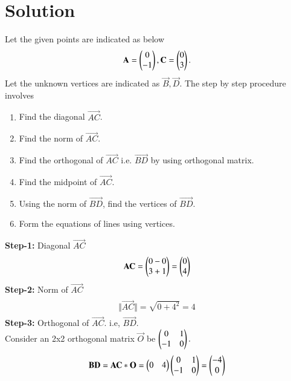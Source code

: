 \documentclass[journal,12pt,twocolumn]{IEEEtran}
\begin{document}
\section{Solution}
Let the given points are indicated as below\\
\begin{align}
\begin{split}
\mathbf{A} = \begin{pmatrix}0 \\ -1\end{pmatrix}, 
\mathbf{C} = \begin{pmatrix}0 \\ 3\end{pmatrix}.\\
\end{split}
\end{align}
Let the unknown vertices are indicated as $ \vec{B},\vec{D}$. The step by step procedure involves
\begin{enumerate}
    \item Find the diagonal $\vec{AC}$.
    \item Find the norm of $\vec{AC}$.
    \item Find the orthogonal of $\vec{AC}$ i.e. $\vec{BD}$ by using orthogonal matrix.
    \item Find the midpoint of $\vec{AC}$.
    \item Using the norm of $\vec{BD}$, find the vertices of $\vec{BD}$.
    \item Form the equations of lines using vertices.
\end{enumerate}
\textbf{Step-1:} Diagonal $\vec{AC}$
\begin{align}
\begin{split}
\mathbf{AC} = \begin{pmatrix}0-0\\3+1\end{pmatrix} = \begin{pmatrix}0\\4\end{pmatrix}
\end{split}
\end{align}
\textbf{Step-2:} Norm of $\vec{AC}$
\begin{align}
\begin{split}
\Vert\vec{AC}\Vert = \sqrt{0+4^2} = 4
\end{split}
\end{align}
\textbf{Step-3:} Orthogonal of $\vec{AC}$. i.e, $\vec{BD}$.
\\
Consider an 2x2 orthogonal matrix $\vec{O}$ be $\begin{pmatrix}0&1\\-1&0\end{pmatrix}.$
\\
\begin{align}
\begin{split}
\mathbf{BD} =  \mathbf{AC} * \mathbf{O} =  \begin{pmatrix}0&4\end{pmatrix}  \begin{pmatrix}0&1\\-1&0\end{pmatrix} = \begin{pmatrix}-4\\0\end{pmatrix}
\end{split}
\end{align}
\end{document}
